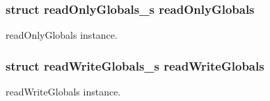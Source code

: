 \subsubsection[{read\+Only\+Globals}]{\setlength{\rightskip}{0pt plus 5cm}struct {\bf read\+Only\+Globals\+\_\+s} read\+Only\+Globals}\label{global_8h_a0287cc1577786208f441d117341d050c}


read\+Only\+Globals instance. 

\subsubsection[{read\+Write\+Globals}]{\setlength{\rightskip}{0pt plus 5cm}struct {\bf read\+Write\+Globals\+\_\+s} read\+Write\+Globals}\label{global_8h_ac79977281f2d7d7bf6309d0217bdac60}


read\+Write\+Globals instance. 

